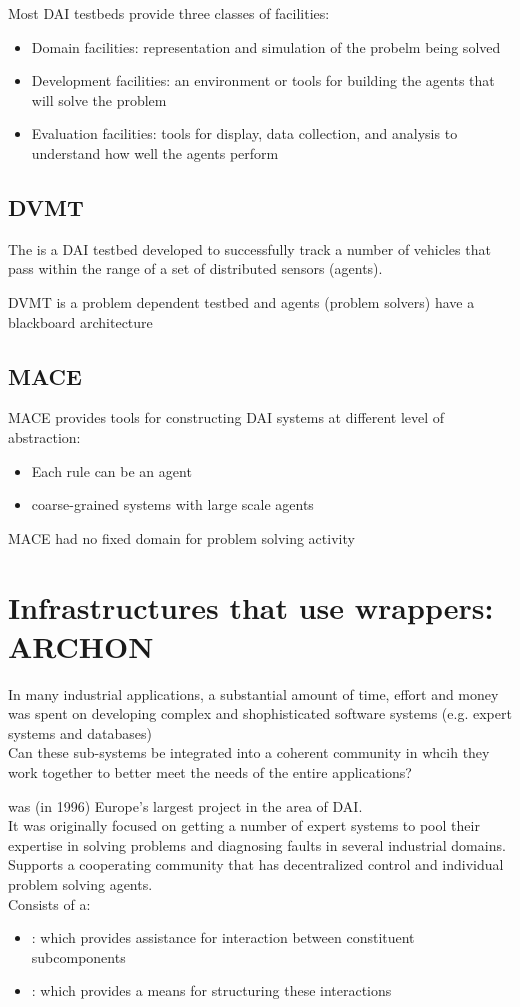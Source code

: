 Most DAI testbeds provide three classes of facilities:
\begin{itemize}
\item Domain facilities: representation and simulation of the probelm being solved
\item Development facilities: an environment or tools for building the agents that will solve the problem
\item Evaluation facilities: tools for display, data collection, and analysis to understand how well the agents perform
\end{itemize}

\subsection{DVMT}
The  is a DAI testbed developed to successfully track a number of vehicles that pass within the range of a set of distributed sensors (agents).

DVMT is a problem dependent testbed and agents (problem solvers) have a blackboard architecture
\subsection{MACE}
MACE provides tools for constructing DAI systems at different level of abstraction:
\begin{itemize}
\item Each rule can be an agent
\item coarse-grained systems with large scale agents
\end{itemize}
MACE had no fixed domain for problem solving activity

\section{Infrastructures that use wrappers: ARCHON}
In many industrial applications, a substantial amount of time, effort and money was spent on developing complex and shophisticated software systems (e.g. expert systems and databases)\\
Can these sub-systems be integrated into a coherent community in whcih they work together to better meet the needs of the entire applications?

 was (in 1996) Europe's largest project in the area of DAI.\\
It was originally focused on getting a number of expert systems to pool their expertise in solving problems and diagnosing faults in several industrial domains.\\
Supports a cooperating community that has decentralized control and individual problem solving agents.\\
Consists of a:
\begin{itemize}
\item {}: which provides assistance for interaction between constituent subcomponents
\item {}: which provides a means for structuring these interactions
\end{itemize}

